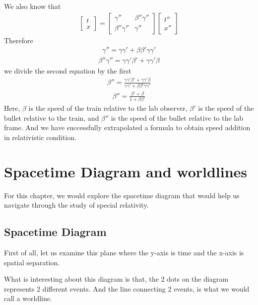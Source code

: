 \documentclass[11pt,letterpaper]{book}
\begin{document}
We also know that 
\begin{align}
\begin{bmatrix}
    t \\ x
\end{bmatrix}
=
\begin{bmatrix}
    \gamma''      &   \beta''\gamma''   \\
    \beta''\gamma'' &   \gamma''
\end{bmatrix}
\begin{bmatrix}
    t''\\ x''
\end{bmatrix}
\end{align}
Therefore
\begin{align}
\gamma'' = \gamma \gamma' + \beta \beta' \gamma \gamma'
\end{align}
\begin{align}
\beta''\gamma'' = \gamma\gamma' \beta' + \gamma \gamma' \beta
\end{align}
we divide the second equation by the first
\begin{align}
\beta '' = \frac{\gamma\gamma' \beta' + \gamma \gamma' \beta}{\gamma \gamma' + \beta \beta' \gamma \gamma'}
\end{align}
\begin{align}
\beta '' = \frac{\beta '+\beta}{1+\beta\beta'}
\end{align}
Here, $\beta$ is the speed of the train relative to the lab observer, $\beta ' $ is the speed of the bullet relative to the train, and $\beta ''$ is the speed of the bullet relative to the lab frame. And we have successfully  extrapolated a formula to obtain speed addition in relativistic condition. 

\section{Spacetime Diagram and worldlines}
For this chapter, we would explore the spacetime diagram that would help us navigate through the study of special relativity.
\subsection{Spacetime Diagram}
First of all, let us examine this plane where the y-axis is time and the x-axis is spatial separation.

What is interesting about this diagram is that, the 2 dots on the diagram represents 2 different events. And the line connecting 2 events, is what we would call a worldline.
\end{document}
